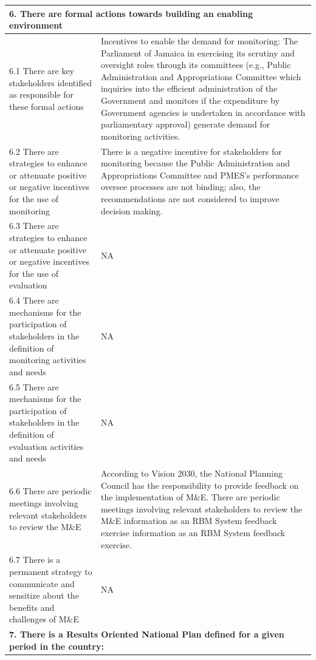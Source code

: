 \documentclass[
  10pt,
]{book}
\begin{document}
\begin{table}
\begin{tabular}[t]{l|l}
\hline
\multicolumn{2}{l}{\textbf{6. There are formal actions towards building an enabling environment}}\\
\hline
\hspace{1em}6.1 There are key stakeholders identified as responsible for these formal actions & Incentives to enable the demand for monitoring: The Parliament of Jamaica in exercising its scrutiny and oversight roles through its committees (e.g., Public Administration and Appropriations Committee which inquiries into the efficient administration of the Government and monitors if the expenditure by Government agencies is undertaken in accordance with parliamentary approval) generate demand for monitoring activities.\\
\hline
\hspace{1em}6.2 There are strategies to enhance or attenuate positive or negative incentives for the use of monitoring & There is a negative incentive for stakeholders for monitoring because the Public Administration and Appropriations Committee and PMES's performance oversee processes are not binding; also, the recommendations are not considered to improve decision making.\\
\hline
\hspace{1em}6.3 There are strategies to enhance or attenuate positive or negative incentives for the use of evaluation & NA\\
\hline
\hspace{1em}6.4 There are mechanisms for the participation of stakeholders in the definition of monitoring activities and needs & NA\\
\hline
\hspace{1em}6.5 There are mechanisms for the participation of stakeholders in the definition of evaluation activities and needs & NA\\
\hline
\hspace{1em}6.6 There are periodic meetings involving relevant stakeholders to review the M\&E & According to Vision 2030, the National Planning Council has the responsibility to provide feedback on the implementation of M\&E. There are periodic meetings involving relevant stakeholders to review the M\&E information as an RBM System feedback exercise information as an RBM System feedback exercise.\\
\hline
\hspace{1em}6.7 There is a permanent strategy to communicate and sensitize about the benefits and challenges of M\&E & NA\\
\hline
\multicolumn{2}{l}{\textbf{7. There is a Results Oriented National Plan defined for a given period in the country:}}\\

\end{tabular}
\end{table}
\end{document}
